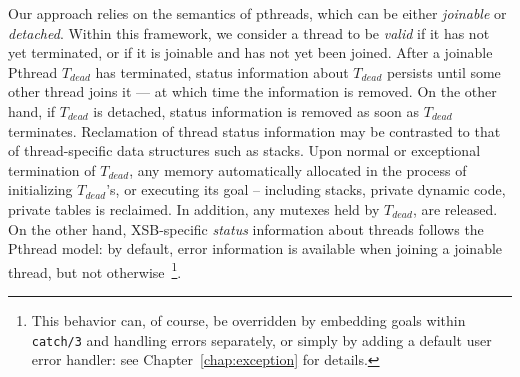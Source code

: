 Our approach relies on the semantics of pthreads, which can be either
{\em joinable} or {\em detached}.  Within this framework, we consider
a thread to be {\em valid} if it has not yet terminated, or if it is
joinable and has not yet been joined.  After a joinable Pthread
$T_{dead}$ has terminated, status information about $T_{dead}$
persists until some other thread joins it --- at which time the
information is removed.  On the other hand, if $T_{dead}$ is detached,
status information is removed as soon as $T_{dead}$ terminates.
Reclamation of thread status information may be contrasted to that of
thread-specific data structures such as stacks.  Upon normal or
exceptional termination of $T_{dead}$, any memory automatically
allocated in the process of initializing $T_{dead}$'s, or executing
its goal -- including stacks, private dynamic code, private tables is
reclaimed.  In addition, any mutexes held by $T_{dead}$, are released.
On the other hand, XSB-specific {\em status} information about threads
follows the Pthread model: by default, error information is available
when joining a joinable thread, but not otherwise~\footnote{This
  behavior can, of course, be overridden by embedding goals within
  {\tt catch/3} and handling errors separately, or simply by adding a
  default user error handler: see Chapter~\ref{chap:exception} for
  details.}.

